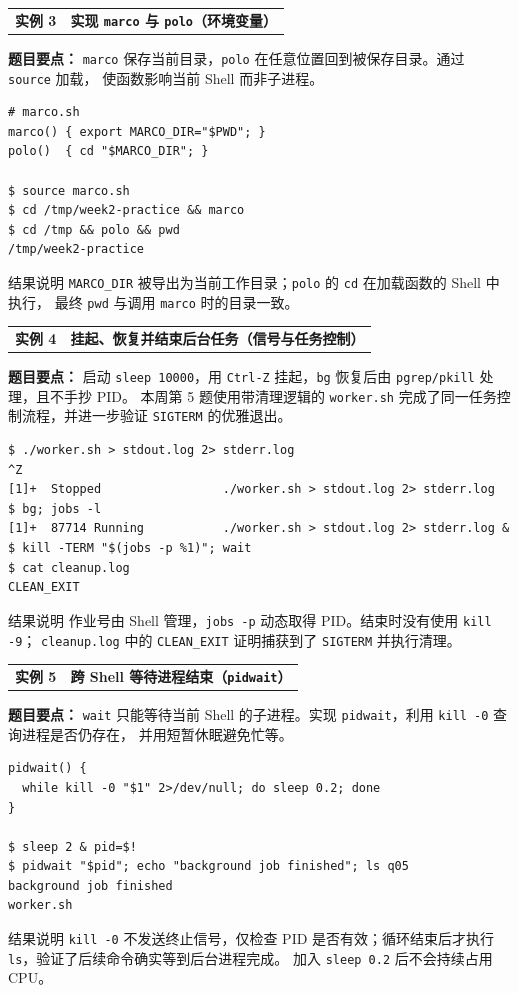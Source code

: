 \documentclass[UTF8,zihao=-4]{ctexart}
\newcommand{\practicebanner}[2]{
  \begin{tcolorbox}[
    colback=soft,
    colframe=navy,
    boxrule=1pt,
    arc=2mm,
    left=4mm,right=4mm,top=2.5mm,bottom=2.5mm]
    \begin{tabularx}{\textwidth}{>{\Large\bfseries\color{navy}}p{2.7cm}X}
      实例 #1 & {\large\bfseries\color{navy}#2}
    \end{tabularx}
  \end{tcolorbox}
}
\begin{document}
\clearpage
\practicebanner{3}{实现 \texttt{marco} 与 \texttt{polo}（环境变量）}
\textbf{题目要点：} \texttt{marco} 保存当前目录，\texttt{polo} 在任意位置回到被保存目录。通过 \texttt{source} 加载，
使函数影响当前 Shell 而非子进程。
\begin{lstlisting}[style=shell]
# marco.sh
marco() { export MARCO_DIR="$PWD"; }
polo()  { cd "$MARCO_DIR"; }

$ source marco.sh
$ cd /tmp/week2-practice && marco
$ cd /tmp && polo && pwd
/tmp/week2-practice
\end{lstlisting}
\begin{summarybox}{结果说明}
\texttt{MARCO\_DIR} 被导出为当前工作目录；\texttt{polo} 的 \texttt{cd} 在加载函数的 Shell 中执行，
最终 \texttt{pwd} 与调用 \texttt{marco} 时的目录一致。
\end{summarybox}

\vspace{0.5cm}
\practicebanner{4}{挂起、恢复并结束后台任务（信号与任务控制）}
\textbf{题目要点：} 启动 \texttt{sleep 10000}，用 \texttt{Ctrl-Z} 挂起，\texttt{bg} 恢复后由 \texttt{pgrep/pkill} 处理，且不手抄 PID。
本周第 5 题使用带清理逻辑的 \texttt{worker.sh} 完成了同一任务控制流程，并进一步验证 \texttt{SIGTERM} 的优雅退出。
\begin{lstlisting}[style=shell]
$ ./worker.sh > stdout.log 2> stderr.log
^Z
[1]+  Stopped                 ./worker.sh > stdout.log 2> stderr.log
$ bg; jobs -l
[1]+  87714 Running           ./worker.sh > stdout.log 2> stderr.log &
$ kill -TERM "$(jobs -p %1)"; wait
$ cat cleanup.log
CLEAN_EXIT
\end{lstlisting}
\begin{summarybox}{结果说明}
作业号由 Shell 管理，\texttt{jobs -p} 动态取得 PID。结束时没有使用 \texttt{kill -9}；
\texttt{cleanup.log} 中的 \texttt{CLEAN\_EXIT} 证明捕获到了 \texttt{SIGTERM} 并执行清理。
\end{summarybox}

\clearpage
\practicebanner{5}{跨 Shell 等待进程结束（\texttt{pidwait}）}
\textbf{题目要点：} \texttt{wait} 只能等待当前 Shell 的子进程。实现 \texttt{pidwait}，利用 \texttt{kill -0} 查询进程是否仍存在，
并用短暂休眠避免忙等。
\begin{lstlisting}[style=shell]
pidwait() {
  while kill -0 "$1" 2>/dev/null; do sleep 0.2; done
}

$ sleep 2 & pid=$!
$ pidwait "$pid"; echo "background job finished"; ls q05
background job finished
worker.sh
\end{lstlisting}
\begin{summarybox}{结果说明}
\texttt{kill -0} 不发送终止信号，仅检查 PID 是否有效；循环结束后才执行 \texttt{ls}，验证了后续命令确实等到后台进程完成。
加入 \texttt{sleep 0.2} 后不会持续占用 CPU。
\end{summarybox}
\end{document}
